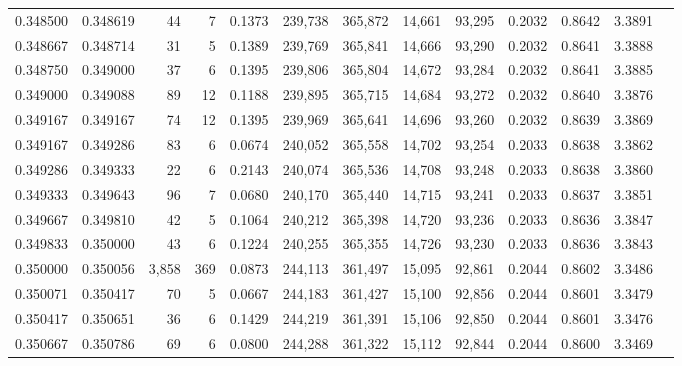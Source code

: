 \begin{tabular}{rrrrrrrrrrrrr}
0.348500 & 0.348619 &    44 &   7 &                                     0.1373 & 239,738 & 365,872 &  14,661 &  93,295 & 0.2032 & 0.8642 & 3.3891 \\
0.348667 & 0.348714 &    31 &   5 &                                     0.1389 & 239,769 & 365,841 &  14,666 &  93,290 & 0.2032 & 0.8641 & 3.3888 \\
0.348750 & 0.349000 &    37 &   6 &                                     0.1395 & 239,806 & 365,804 &  14,672 &  93,284 & 0.2032 & 0.8641 & 3.3885 \\
0.349000 & 0.349088 &    89 &  12 &                                     0.1188 & 239,895 & 365,715 &  14,684 &  93,272 & 0.2032 & 0.8640 & 3.3876 \\
0.349167 & 0.349167 &    74 &  12 &                                     0.1395 & 239,969 & 365,641 &  14,696 &  93,260 & 0.2032 & 0.8639 & 3.3869 \\
0.349167 & 0.349286 &    83 &   6 &                                     0.0674 & 240,052 & 365,558 &  14,702 &  93,254 & 0.2033 & 0.8638 & 3.3862 \\
0.349286 & 0.349333 &    22 &   6 &                                     0.2143 & 240,074 & 365,536 &  14,708 &  93,248 & 0.2033 & 0.8638 & 3.3860 \\
0.349333 & 0.349643 &    96 &   7 &                                     0.0680 & 240,170 & 365,440 &  14,715 &  93,241 & 0.2033 & 0.8637 & 3.3851 \\
0.349667 & 0.349810 &    42 &   5 &                                     0.1064 & 240,212 & 365,398 &  14,720 &  93,236 & 0.2033 & 0.8636 & 3.3847 \\
0.349833 & 0.350000 &    43 &   6 &                                     0.1224 & 240,255 & 365,355 &  14,726 &  93,230 & 0.2033 & 0.8636 & 3.3843 \\
0.350000 & 0.350056 & 3,858 & 369 &                                     0.0873 & 244,113 & 361,497 &  15,095 &  92,861 & 0.2044 & 0.8602 & 3.3486 \\
0.350071 & 0.350417 &    70 &   5 &                                     0.0667 & 244,183 & 361,427 &  15,100 &  92,856 & 0.2044 & 0.8601 & 3.3479 \\
0.350417 & 0.350651 &    36 &   6 &                                     0.1429 & 244,219 & 361,391 &  15,106 &  92,850 & 0.2044 & 0.8601 & 3.3476 \\
0.350667 & 0.350786 &    69 &   6 &                                     0.0800 & 244,288 & 361,322 &  15,112 &  92,844 & 0.2044 & 0.8600 & 3.3469 \\

\end{tabular}
